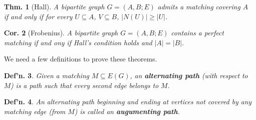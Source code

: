 \documentclass[12pt, a4paper]{book}
\newtheorem{theorem}{Thm.}[section]
\newtheorem{definition}[theorem]{Def'n.}
\newtheorem{corollary}[theorem]{Cor.}
\theoremstyle{nonumberplain}
\begin{document}
\begin{theorem}[Hall]
    A bipartite graph $G=(A,B;E)$ admits a matching covering $A$ if and only if for every $U\subseteq A$, $V\subseteq B$, $|N(U)|\geq |U|$.
\end{theorem}
\begin{corollary}[Frobenius]
    A bipartite graph $G=(A,B;E)$ contains a perfect matching if and ony if Hall's condition holds and $|A|=|B|$.
\end{corollary}
We need a few definitions to prove these theorems.
\begin{definition}
    Given a matching $M\subseteq E(G)$, an \textbf{alternating path} (with respect to $M$) is a path such that every second edge belongs to $M$.
\end{definition}
\begin{definition}
    An alternating path beginning and ending at vertices not covered by any matching edge (from $M$) is called an \textbf{augumenting path}.
\end{definition}
\end{document}
